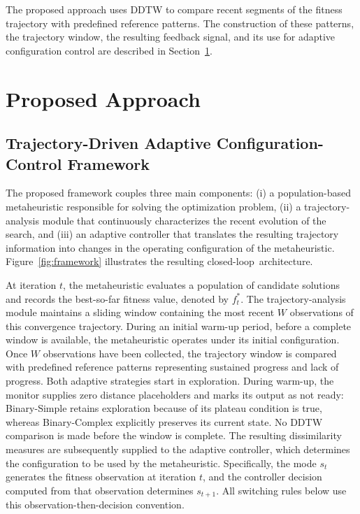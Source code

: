 \documentclass[mathematics,article,accept,moreauthors]{Definitions/mdpi}
\begin{document}
The proposed approach uses DDTW to compare recent segments of the fitness
trajectory with predefined reference patterns. The construction of these
patterns, the trajectory window, the resulting feedback signal, and its use
for adaptive configuration control are described in
Section~\ref{sec:proposed_approach}.



\section{Proposed Approach}
\label{sec:proposed_approach}

\subsection{Trajectory-Driven Adaptive Configuration-Control Framework}
\label{sec:framework_arch}

The proposed framework couples three main components: (i) a population-based
metaheuristic responsible for solving the optimization problem, (ii) a
trajectory-analysis module that continuously characterizes the recent
evolution of the search, and (iii) an adaptive controller that translates
the resulting trajectory information into changes in the operating
configuration of the metaheuristic. Figure~\ref{fig:framework} illustrates
the resulting \mbox{closed-loop architecture.}

At iteration $t$, the metaheuristic evaluates a population of candidate
solutions and records the best-so-far fitness value, denoted by $f_t^*$.
The trajectory-analysis module maintains a sliding window containing the
most recent $W$ observations of this convergence trajectory. During an
initial warm-up period, before a complete window is available, the
metaheuristic operates under its initial configuration. Once $W$
observations have been collected, the trajectory window is compared with
predefined reference patterns representing sustained progress and lack of
progress. Both adaptive strategies start in exploration. During warm-up,
the monitor supplies zero distance placeholders and marks its output as
not ready: Binary-Simple retains exploration because of its plateau condition
is true, whereas Binary-Complex explicitly preserves its current state.
No DDTW comparison is made before the window is complete.
The resulting dissimilarity measures are subsequently supplied
to the adaptive controller, which determines the configuration to be used
by the metaheuristic. Specifically, the mode $s_t$ generates the fitness
observation at iteration $t$, and the controller decision computed from
that observation determines $s_{t+1}$. All switching rules below use this
observation-then-decision convention.
\end{document}
